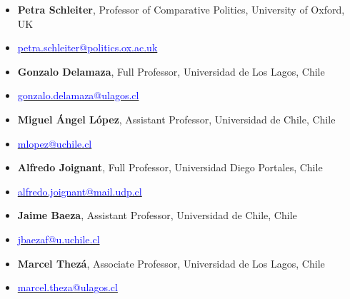 \begin{publications}

\begin{itemize}
\item[]{\small {\bfseries Petra Schleiter}, Professor of Comparative Politics, University of Oxford, UK}
\item[]{\vspace{-1mm}\textcolor{oxfordblue}{\faEnvelope} \hspace{0.1mm} {\small \href{mailto:petra.schleiter@politics.ox.ac.uk}{\textcolor{blue}{petra.schleiter@politics.ox.ac.uk}}}} \vspace{1.5mm}
\item[]{\small {\bfseries Gonzalo Delamaza}, Full Professor, Universidad de Los Lagos, Chile}
\item[]{\vspace{-1mm}\textcolor{oxfordblue}{\faEnvelope} \hspace{0.1mm} {\small \href{mailto:gonzalo.delamaza@ulagos.cl}{\textcolor{blue}{gonzalo.delamaza@ulagos.cl}}}} \pagebreak %
\item[]{\small {\bfseries Miguel \'Angel L\'opez}, Assistant Professor, Universidad de Chile, Chile}
\item[]{\vspace{-1mm}\textcolor{oxfordblue}{\faEnvelope} \hspace{0.1mm} {\small \href{mailto:mlopez@uchile.cl}{\textcolor{blue}{mlopez@uchile.cl}}}} \vspace{1.5mm}
\item[]{\small {\bfseries Alfredo Joignant}, Full Professor, Universidad Diego Portales, Chile}
\item[]{\vspace{-1mm}\textcolor{oxfordblue}{\faEnvelope} \hspace{0.1mm} {\small \href{mailto:alfredo.joignant@mail.udp.cl}{\textcolor{blue}{alfredo.joignant@mail.udp.cl}}}} \vspace{1.5mm}
\item[]{\small {\bfseries Jaime Baeza}, Assistant Professor, Universidad de Chile, Chile}
\item[]{\vspace{-1mm}\textcolor{oxfordblue}{\faEnvelope} \hspace{0.1mm} {\small \href{mailto:jbaezaf@u.uchile.cl}{\textcolor{blue}{jbaezaf@u.uchile.cl}}}} \vspace{1.5mm}
\item[]{\small {\bfseries Marcel Thez\'a}, Associate Professor, Universidad de Los Lagos, Chile}
\item[]{\vspace{-1mm}\textcolor{oxfordblue}{\faEnvelope} \hspace{0.1mm} {\small \href{mailto:marcel.theza@ulagos.cl}{\textcolor{blue}{marcel.theza@ulagos.cl}}}} \vspace{1.5mm}
\end{itemize}

\end{publications}
